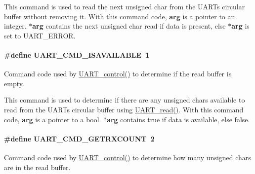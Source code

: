 This command is used to read the next unsigned char from the U\+A\+R\+T\textquotesingle{}s circular buffer without removing it. With this command code, {\bfseries arg} is a pointer to an integer. {\bfseries $\ast$arg} contains the next {\ttfamily unsigned} {\ttfamily char} read if data is present, else {\bfseries $\ast$arg} is set to U\+A\+R\+T\+\_\+\+E\+R\+R\+O\+R. 
\paragraph[{U\+A\+R\+T\+\_\+\+C\+M\+D\+\_\+\+I\+S\+A\+V\+A\+I\+L\+A\+B\+L\+E}]{\setlength{\rightskip}{0pt plus 5cm}\#define U\+A\+R\+T\+\_\+\+C\+M\+D\+\_\+\+I\+S\+A\+V\+A\+I\+L\+A\+B\+L\+E~1}\label{group___u_a_r_t___c_m_d_gaf5be6db621c5b048637dc93b26797693}


Command code used by \hyperlink{_u_a_r_t_8h_a9de3c26cfe4ce6b7f350a6ea6e16801d}{U\+A\+R\+T\+\_\+control()} to determine if the read buffer is empty. 

This command is used to determine if there are any unsigned chars available to read from the U\+A\+R\+T\textquotesingle{}s circular buffer using \hyperlink{_u_a_r_t_8h_a023152d57539cad94bdd813956013e73}{U\+A\+R\+T\+\_\+read()}. With this command code, {\bfseries arg} is a pointer to a {\ttfamily bool}. {\bfseries $\ast$arg} contains {\ttfamily true} if data is available, else {\ttfamily false}. 
\paragraph[{U\+A\+R\+T\+\_\+\+C\+M\+D\+\_\+\+G\+E\+T\+R\+X\+C\+O\+U\+N\+T}]{\setlength{\rightskip}{0pt plus 5cm}\#define U\+A\+R\+T\+\_\+\+C\+M\+D\+\_\+\+G\+E\+T\+R\+X\+C\+O\+U\+N\+T~2}\label{group___u_a_r_t___c_m_d_ga470321cbd9eccf137ffbe6553ae7f35f}


Command code used by \hyperlink{_u_a_r_t_8h_a9de3c26cfe4ce6b7f350a6ea6e16801d}{U\+A\+R\+T\+\_\+control()} to determine how many unsigned chars are in the read buffer. 

